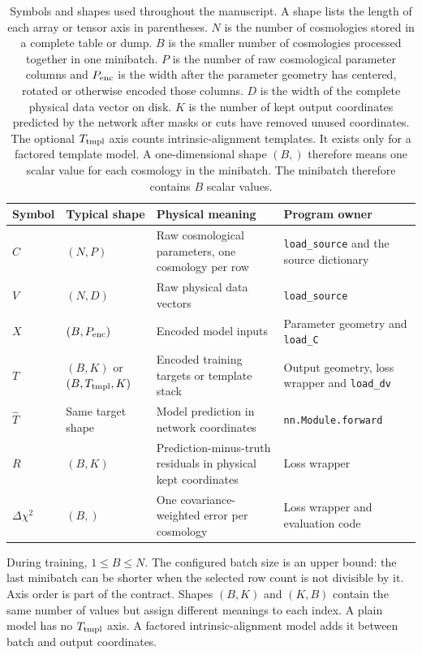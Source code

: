 \documentclass[10pt,aps,prd,twocolumn,nofootinbib]{revtex4-2}
\newcommand{\code}[1]{\texttt{#1}}
\begin{document}
\begin{table}[t]
\centering
\begin{tabular}{p{}p{}p{}p{}}
\toprule
Symbol & Typical shape & Physical meaning & Program owner \\
\midrule
$C$ & $(N,P)$ & Raw cosmological parameters, one cosmology per row &
\code{load\_source} and the source dictionary \\
$V$ & $(N,D)$ & Raw physical data vectors & \code{load\_source} \\
$X$ & $(B,P_{\rm enc})$ & Encoded model inputs & Parameter geometry and
\code{load\_C} \\
$T$ & $(B,K)$ or $(B,T_{\rm tmpl},K)$ & Encoded training targets or template
stack & Output geometry, loss wrapper and \code{load\_dv} \\
$\widehat T$ & Same target shape & Model prediction in network coordinates &
\code{nn.Module.forward} \\
$R$ & $(B,K)$ & Prediction-minus-truth residuals in physical kept coordinates &
Loss wrapper \\
$\Delta\chi^2$ & $(B,)$ & One covariance-weighted error per cosmology & Loss
wrapper and evaluation code \\
\bottomrule
\end{tabular}
\caption{Symbols and shapes used throughout the manuscript.  A shape lists
the length of each array or tensor axis in parentheses.  $N$ is the number
of cosmologies stored in a complete table or dump.  $B$ is the smaller number
of cosmologies processed together in one minibatch.  $P$ is
the number of raw cosmological parameter columns and $P_{\rm enc}$ is the
width after the parameter geometry has centered, rotated or otherwise
encoded those columns.  $D$ is the width of the complete physical data
vector on disk.  $K$ is the number of kept output coordinates predicted by
the network after masks or cuts have removed unused coordinates.  The
optional $T_{\rm tmpl}$ axis counts intrinsic-alignment templates.  It exists
only for a factored template model.  A one-dimensional shape $(B,)$ therefore
means one scalar value for each cosmology in the minibatch.  The minibatch
therefore contains $B$ scalar values.}
\label{tab:shape-notation}
\end{table}

During training, $1\le B\le N$.  The configured batch size is an upper bound:
the last minibatch can be shorter when the selected row count is not divisible
by it.  Axis order is part of the contract.  Shapes $(B,K)$ and $(K,B)$ contain
the same number of values but assign different meanings to each index.  A
plain model has no $T_{\rm tmpl}$ axis.  A factored intrinsic-alignment model
adds it between batch and output coordinates.
\end{document}
